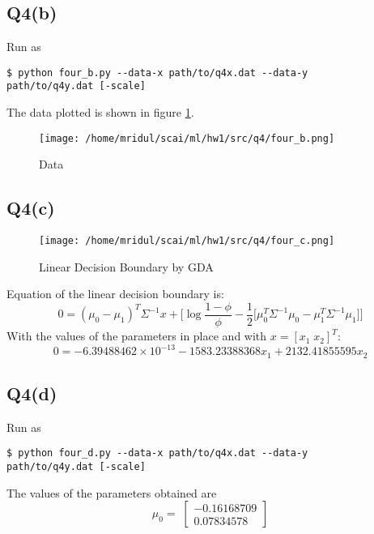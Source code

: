 \documentclass[11pt]{article}
\begin{document}
\subsection{Q4(b)}
\label{sec:org588e992}
\begin{codebox}
Run as
\begin{verbatim}
$ python four_b.py --data-x path/to/q4x.dat --data-y
path/to/q4y.dat [-scale]
\end{verbatim}
\end{codebox}
The data plotted is shown in figure \ref{fig:orgd01715b}.
\begin{figure}[!ht]
\centering
\texttt{[image: /home/mridul/scai/ml/hw1/src/q4/four\_b.png]}
\caption{\label{fig:orgd01715b}Data}
\end{figure}
\clearpage
\subsection{Q4(c)}
\label{sec:org063d9de}
\begin{figure}[!ht]
\centering
\texttt{[image: /home/mridul/scai/ml/hw1/src/q4/four\_c.png]}
\caption{\label{fig:orgf0f2c0a}Linear Decision Boundary by GDA}
\end{figure}
Equation of the linear decision boundary is:
\begin{equation*}
0=(\mu_0-\mu_1)^T\Sigma^{-1}x+\biggl[
\log{\frac{1-\phi}{\phi}}
-\frac{1}{2}\bigl[
\mu_0^T\Sigma^{-1}\mu_0 - \mu_1^T\Sigma^{-1}\mu_1
\bigr]
\biggr]
\end{equation*}
With the values of the parameters in place and with \(x=[x_1\; x_2]^T\):
\begin{equation}
0=-6.39488462\times10^{-13}-1583.23388368x_1+2132.41855595x_2
\end{equation}
\subsection{Q4(d)}
\label{sec:org1f9433b}
\begin{codebox}
Run as
\begin{verbatim}
$ python four_d.py --data-x path/to/q4x.dat --data-y
path/to/q4y.dat [-scale]
\end{verbatim}
\end{codebox}
The values of the parameters obtained are
\begin{equation*}
\mu_0 = \;
\begin{bmatrix}
-0.16168709\\
0.07834578
\end{bmatrix}
\end{equation*}
\end{document}
